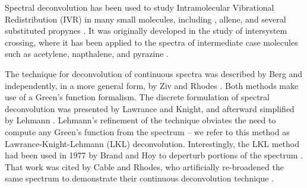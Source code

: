 Spectral deconvolution has been used to study Intramolecular
Vibrational Redistribution (IVR) in many small molecules, including
, allene, and several substituted propynes \cite{cable80,
  timmermans95, andrews98, hudspeth98}.  It was originally developed
in the study of intersystem crossing, where it has been applied to the
spectra of intermediate case molecules such as acetylene, napthalene,
and pyrazine \cite{drabbels94, cable80, lawrance85}.

The technique for deconvolution of continuous spectra was described by
Berg and independently, in a more general form, by Ziv and Rhodes
\cite{berg76, ziv76}.  Both methods make use of a Green's function
formalism.  The discrete formulation of spectral deconvolution was
presented by Lawrance and Knight, and afterward simplified by Lehmann
\cite{lawrance85, lehmann91}.  Lehmann's refinement of the technique
obviates the need to compute any Green's function from the spectrum --
we refer to this method as Lawrance-Knight-Lehmann (LKL)
deconvolution.  Interestingly, the LKL method had been used in 1977 by
Brand and Hoy to deperturb portions of the  spectrum
\cite{brand77}.  That work was cited by Cable and Rhodes, who
artificially re-broadened the same spectrum to demonstrate their
continuous deconvolution technique \cite{cable80}.


